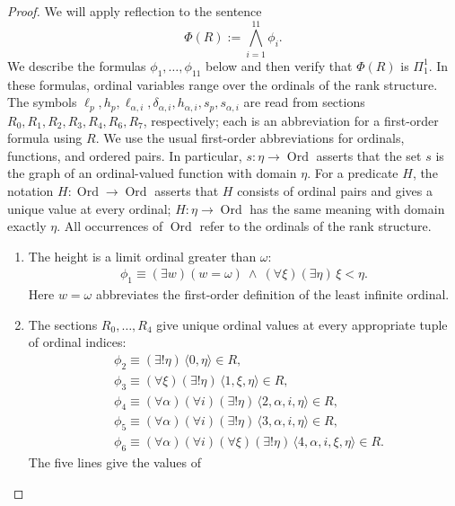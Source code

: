 \documentclass[11pt,a4paper]{amsart}
\theoremstyle{definition}
\theoremstyle{remark}
\DeclareMathOperator{\Ord}{Ord}
\begin{document}
\begin{proof}
We will apply reflection to the sentence
\[
 \Phi(R):=\bigwedge_{i=1}^{11}\phi_i.
\]
We describe the formulas \(\phi_1,\ldots,\phi_{11}\) below
and then verify that \(\Phi(R)\) is \(\Pi^1_1\).
In these formulas, ordinal variables range over the ordinals of the
rank structure. The symbols
\(\ell_p,\allowbreak h_p,\allowbreak\ell_{\alpha,i},\allowbreak
\delta_{\alpha,i},\allowbreak h_{\alpha,i},\allowbreak s_p,\allowbreak s_{\alpha,i}\) are read from sections \(R_0,\allowbreak R_1,\allowbreak R_2,\allowbreak R_3,
\allowbreak R_4,\allowbreak R_6,\allowbreak R_7\), respectively;
each is an abbreviation for a first-order formula using \(R\).
We use the usual first-order abbreviations for
ordinals, functions, and ordered pairs. In particular,
\(s:\eta\to\Ord\) asserts that the set \(s\) is the graph
of an ordinal-valued function with domain \(\eta\).
For a predicate \(H\), the notation \(H:\Ord\to\Ord\)
asserts that \(H\) consists of ordinal pairs and gives a
unique value at every ordinal; \(H:\eta\to\Ord\) has the
same meaning with domain exactly \(\eta\). All occurrences
of \(\Ord\) refer to the ordinals of the rank structure.
\begin{enumerate}[label=\textup{(\alph*)}]
\item The height is a limit ordinal greater than \(\omega\):
\[
\begin{aligned}
\phi_{1}\equiv (\exists w)(w=\omega)\ \land\
 (\forall\xi)(\exists\eta)\,\xi<\eta.
\end{aligned}
\]
Here \(w=\omega\) abbreviates the first-order definition
of the least infinite ordinal.
\item The sections \(R_0,\ldots,R_4\) give unique ordinal
values at every appropriate tuple of ordinal indices:
\[
\begin{aligned}
 &\phi_2 \equiv (\exists!\eta)\,\langle0,\eta\rangle\in R,\\
 &\phi_3 \equiv (\forall\xi)(\exists!\eta)\,
                         \langle1,\xi,\eta\rangle\in R,\\
 &\phi_4 \equiv (\forall\alpha)(\forall i)(\exists!\eta)\,
                         \langle2,\alpha,i,\eta\rangle\in R,\\
 &\phi_5 \equiv (\forall\alpha)(\forall i)(\exists!\eta)\,
                         \langle3,\alpha,i,\eta\rangle\in R,\\
 &\phi_6 \equiv (\forall\alpha)(\forall i)(\forall\xi)(\exists!\eta)\,
                         \langle4,\alpha,i,\xi,\eta\rangle\in R.
\end{aligned}
\]
The five lines give the values of

\end{enumerate}
\end{proof}
\end{document}

